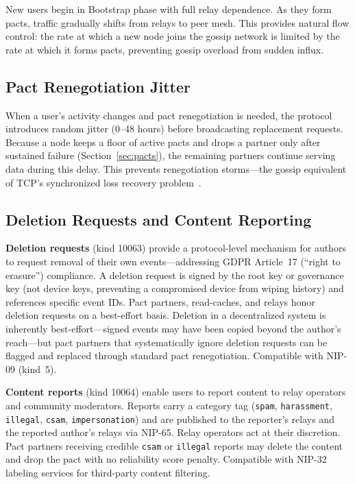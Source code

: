 \documentclass[11pt,a4paper]{article}
\begin{document}
New users begin in Bootstrap phase with full relay dependence. As they form pacts, traffic gradually shifts from relays to peer mesh. This provides natural flow control: the rate at which a new node joins the gossip network is limited by the rate at which it forms pacts, preventing gossip overload from sudden influx.

\subsection{Pact Renegotiation Jitter}

When a user's activity changes and pact renegotiation is needed, the protocol introduces random jitter (0--48 hours) before broadcasting replacement requests. Because a node keeps a floor of active pacts and drops a partner only after sustained failure (Section~\ref{sec:pacts}), the remaining partners continue serving data during this delay. This prevents renegotiation storms---the gossip equivalent of TCP's synchronized loss recovery problem~\cite{jacobson}.

\subsection{Deletion Requests and Content Reporting}

\textbf{Deletion requests} (kind 10063) provide a protocol-level mechanism for authors to request removal of their own events---addressing GDPR Article~17 (``right to erasure'') compliance. A deletion request is signed by the root key or governance key (not device keys, preventing a compromised device from wiping history) and references specific event IDs. Pact partners, read-caches, and relays honor deletion requests on a best-effort basis. Deletion in a decentralized system is inherently best-effort---signed events may have been copied beyond the author's reach---but pact partners that systematically ignore deletion requests can be flagged and replaced through standard pact renegotiation. Compatible with NIP-09 (kind~5).

\textbf{Content reports} (kind 10064) enable users to report content to relay operators and community moderators. Reports carry a category tag (\texttt{spam}, \texttt{harassment}, \texttt{illegal}, \texttt{csam}, \texttt{impersonation}) and are published to the reporter's relays and the reported author's relays via NIP-65. Relay operators act at their discretion. Pact partners receiving credible \texttt{csam} or \texttt{illegal} reports may delete the content and drop the pact with no reliability score penalty. Compatible with NIP-32 labeling services for third-party content filtering.
\end{document}
